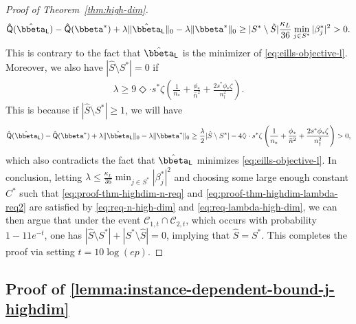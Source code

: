 \documentclass[10pt]{article}
\numberwithin{equation}{section}
\begin{document}
\begin{proof}[Proof of Theorem~\ref{thm:high-dim}]
\begin{align*}
    \hat{\mathsf{Q}}(\hat{\bbeta}_{\mathsf{L}}) - \hat{\mathsf{Q}}(\bbeta^*) + \lambda \|\hat{\bbeta}_{\mathsf{L}}\|_0 - \lambda \|\bbeta^*\|_0 \ge |S^*\setminus \hat{S}| \frac{\kappa_L}{36} \min_{j\in S^*}|\beta^*_j|^2 > 0.
\end{align*} This is contrary to the fact that $\hat{\bbeta}_{\mathsf{L}}$ is the minimizer of \eqref{eq:eills-objective-l}. Moreover, we also have $|\hat{S} \setminus S^*| = 0$ if
\begin{align}
\label{eq:proof-thm-highdim-lambda-req2}
    \lambda \ge 9 \Diamond \cdot s^* \zeta \left(\frac{1}{n_*} + \frac{\phi_*}{\bar{n}^2} + \frac{2s^* \phi_* \zeta}{n_\dagger^2}\right).
\end{align} This is because if $|\hat{S} \setminus S^*| \ge 1$, we will have
\begin{align*}
    \hat{\mathsf{Q}}(\hat{\bbeta}_{\mathsf{L}}) - \hat{\mathsf{Q}}(\bbeta^*) + \lambda \|\hat{\bbeta}_{\mathsf{L}}\|_0 - \lambda \|\bbeta^*\|_0 \ge \frac{\lambda}{2} |\hat{S} \setminus S^*| - 4 \Diamond \cdot s^* \zeta \left(\frac{1}{n_*} + \frac{\phi_*}{\bar{n}^2} + \frac{2s^* \phi_* \zeta}{n_\dagger^2}\right) > 0,
\end{align*} which also contradicts the fact that $\hat{\bbeta}_{\mathsf{L}}$ minimizes \eqref{eq:eills-objective-l}. In conclusion, letting $\lambda \le \frac{\kappa_L}{36} \min_{j\in S^*} |\beta_j^*|^2$ and choosing some large enough constant $C^*$ such that \eqref{eq:proof-thm-highdim-n-req} and \eqref{eq:proof-thm-highdim-lambda-req2} are satisfied by \eqref{eq:req-n-high-dim} and \eqref{eq:req-lambda-high-dim}, we can then argue that under the event $\mathcal{C}_{1,t} \cap \mathcal{C}_{2,t}$, which occurs with probability $1-11e^{-t}$, one has $|\hat{S}\setminus S^*| + |S^*\setminus \hat{S}| = 0$, implying that $\hat{S} = S^*$. This completes the proof via setting $t=10\log (ep)$. 
\end{proof}

\subsection{Proof of \cref{lemma:instance-dependent-bound-j-highdim}}
\label{subsec:proof-instance-dependent-bound-j-highdim}
\end{document}

